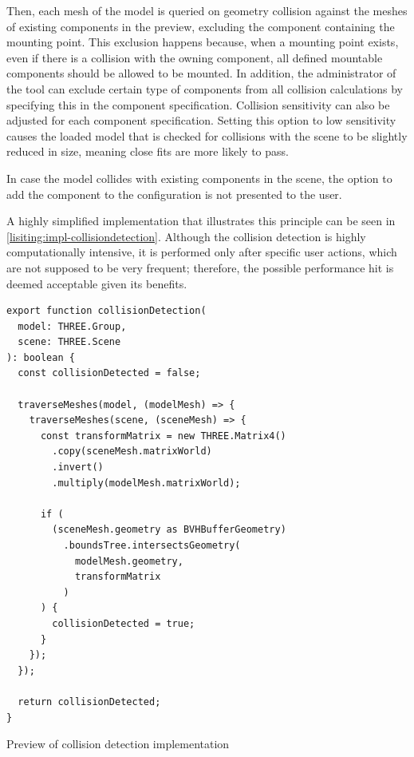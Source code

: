 Then, each mesh of the model is queried on geometry collision against the meshes of existing components in the preview, excluding the component containing the mounting point. This exclusion happens because, when a mounting point exists, even if there is a collision with the owning component, all defined mountable components should be allowed to be mounted. In addition, the administrator of the tool can exclude certain type of components from all collision calculations by specifying this in the component specification. Collision sensitivity can also be adjusted for each component specification. Setting this option to low sensitivity causes the loaded model that is checked for collisions with the scene to be slightly reduced in size, meaning close fits are more likely to pass.

In case the model collides with existing components in the scene, the option to add the component to the configuration is not presented to the user.

A highly simplified implementation that illustrates this principle can be seen in \autoref{lisiting:impl-collisiondetection}. Although the collision detection is highly computationally intensive, it is performed only after specific user actions, which are not supposed to be very frequent; therefore, the possible performance hit is deemed acceptable given its benefits.

\begin{listing}[h]
\begin{verbatim}
export function collisionDetection(
  model: THREE.Group,
  scene: THREE.Scene
): boolean {
  const collisionDetected = false;

  traverseMeshes(model, (modelMesh) => {
    traverseMeshes(scene, (sceneMesh) => {
      const transformMatrix = new THREE.Matrix4()
        .copy(sceneMesh.matrixWorld)
        .invert()
        .multiply(modelMesh.matrixWorld);

      if (
        (sceneMesh.geometry as BVHBufferGeometry)
          .boundsTree.intersectsGeometry(
            modelMesh.geometry,
            transformMatrix
          )
      ) {
        collisionDetected = true;
      }
    });
  });

  return collisionDetected;
}
\end{verbatim}
\caption{Preview of collision detection implementation}
\label{lisiting:impl-collisiondetection}
\end{listing}


